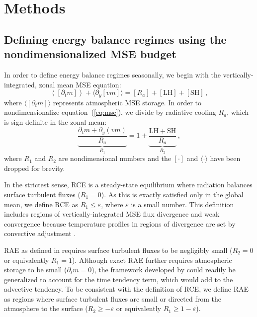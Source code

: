 \documentclass{ametsocV5}
\begin{document}
\section{Methods}\label{sec:methods}
    \subsection{Defining energy balance regimes using the nondimensionalized MSE budget} \label{subsec:mse}
    In order to define energy balance regimes seasonally, we begin with the vertically-integrated, zonal mean MSE equation:
    \begin{equation} \label{eq:mse}
        \left\langle\left[\partial_t m\right]\right\rangle + \langle\partial_y [vm]\rangle = [R_{a}] + \mathrm{[LH]+[SH]} \, ,
    \end{equation}
    where $\langle[\partial_t m]\rangle$ represents atmospheric MSE storage. In order to nondimensionalize equation~(\ref{eq:mse}), we divide by radiative cooling $R_a$, which is sign definite in the zonal mean:
    \begin{equation}
        {\underbrace{\frac{\partial_t m + \partial_y (vm)}{R_{a}}}_{R_1}} = 1 + {\underbrace{\frac{\mathrm{LH+SH}}{R_{a}}}_{R_2}} \, ,
    \end{equation}
    where $R_1$ and $R_2$ are nondimensional numbers and the $[\cdot]$ and $\langle\cdot\rangle$ have been dropped for brevity. 

    In the strictest sense, RCE is a steady-state equilibrium where radiation balances surface turbulent fluxes (\(R_{1}=0\)). As this is exactly satisfied only in the global mean, we define RCE as \(R_{1}\le \varepsilon\), where $\varepsilon$ is a small number. This definition includes regions of vertically-integrated MSE flux divergence and weak convergence because temperature profiles in regions of divergence are set by convective adjustment \citep{warren2020}.

    RAE as defined in \cite{cronin2016} requires surface turbulent fluxes to be negligibly small (\(R_{2}=0\) or equivalently \(R_{1}=1\)). Although exact RAE further requires atmospheric storage to be small ($\partial_t m=0$), the framework developed by \cite{cronin2016} could readily be generalized to account for the time tendency term, which would add to the advective tendency. To be consistent with the definition of RCE, we define RAE as regions where surface turbulent fluxes are small or directed from the atmosphere to the surface (\(R_{2} \ge -\varepsilon \) or equivalently \(R_{1} \ge 1-\varepsilon\)).
\end{document}
